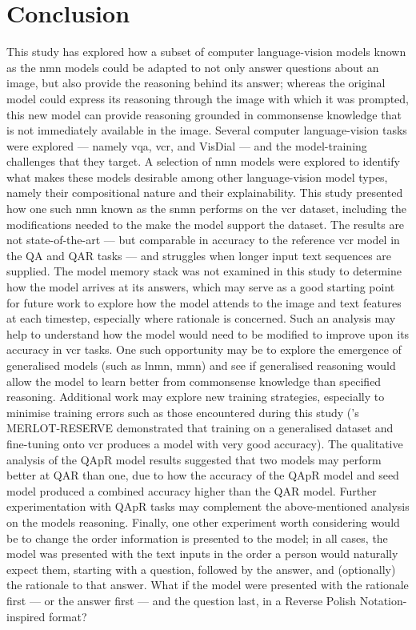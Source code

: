 \chapter{Conclusion}
\label{chp:conclusion}

This study has explored how a subset of computer language-vision models known as the \gls{nmn} models could be adapted to not only answer questions about an image, but also provide the reasoning behind its answer; whereas the original model could express its reasoning through the image with which it was prompted, this new model can provide reasoning grounded in commonsense knowledge that is not immediately available in the image.
Several computer language-vision tasks were explored --- namely \gls{vqa}, \gls{vcr}, and VisDial --- and the model-training challenges that they target.
A selection of \gls{nmn} models were explored to identify what makes these models desirable among other language-vision model types, namely their compositional nature and their explainability.
This study presented how one such \gls{nmn} known as the \gls{snmn} performs on the \gls{vcr} dataset, including the modifications needed to the make the model support the dataset.
The results are not state-of-the-art --- but comparable in accuracy to the reference \gls{vcr} model in the Q\rightarrow{}A and QA\rightarrow{}R tasks --- and struggles when longer input text sequences are supplied.
The model memory stack was not examined in this study to determine how the model arrives at its answers, which may serve as a good starting point for future work to explore how the model attends to the image and text features at each timestep, especially where rationale is concerned.
Such an analysis may help to understand how the model would need to be modified to improve upon its accuracy in \gls{vcr} tasks.
One such opportunity may be to explore the emergence of generalised models (such as \gls{lnmn}, \gls{mmn}) and see if generalised reasoning would allow the model to learn better from commonsense knowledge than specified reasoning.
Additional work may explore new training strategies, especially to minimise training errors such as those encountered during this study (\citeauthor{zellers_merlot_2022}'s MERLOT-RESERVE demonstrated that training on a generalised dataset and fine-tuning onto \gls{vcr} produces a model with very good accuracy).
The qualitative analysis of the QAp\rightarrow{}R model results suggested that two models may perform better at Q\rightarrow{}AR than one, due to how the accuracy of the QAp\rightarrow{}R model and seed model produced a combined accuracy higher than the Q\rightarrow{}AR model.
Further experimentation with QAp\rightarrow{}R tasks may complement the above-mentioned analysis on the models reasoning.
Finally, one other experiment worth considering would be to change the order information is presented to the model; in all cases, the model was presented with the text inputs in the order a person would naturally expect them, starting with a question, followed by the answer, and (optionally) the rationale to that answer.
What if the model were presented with the rationale first --- or the answer first --- and the question last, in a Reverse Polish Notation-inspired format?
